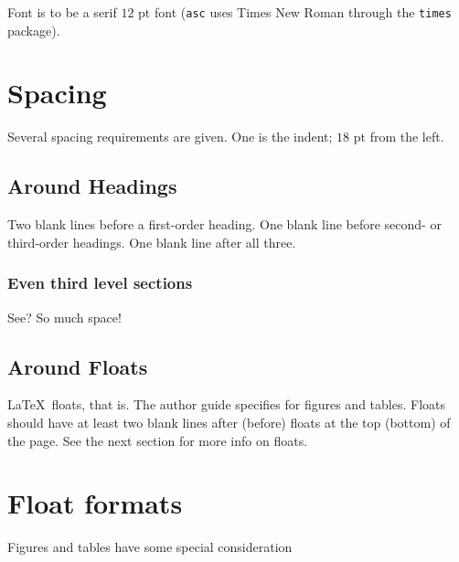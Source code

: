 \documentclass[]{asc}
\begin{document}
Font is to be a serif $12 \text{~pt}$ font (\texttt{asc} uses Times New Roman through the \texttt{times} package).

\section*{Spacing}

Several spacing requirements are given.
One is the indent; $18 \text{~pt}$ from the left.

\subsection*{Around Headings}

Two blank lines before a first-order heading.
One blank line before second- or third-order headings.
One blank line after all three.

\subsubsection*{Even third level sections}

See?
So much space!

\subsection*{Around Floats}

\LaTeX\ floats, that is.
The author guide specifies for figures and tables.
Floats should have at least two blank lines after (before) floats at the top (bottom) of the page.
See the next section for more info on floats.

\section*{Float formats}

Figures and tables have some special consideration
\end{document}

